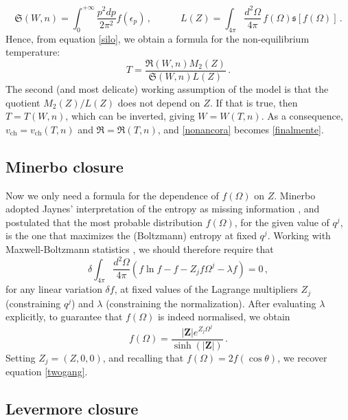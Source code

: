 \documentclass[a4paper, amsfonts, amssymb, amsmath, reprint, showkeys, nofootinbib, twoside, onecolumn, notitlepage]{revtex4-1}
\newcommand{\spc}{\quad \quad \quad}
\begin{document}
\begin{equation}
\mathfrak{S}(W,n)= \int_0^{+\infty} \dfrac{p^2 dp}{2\pi^2} f(\epsilon_p) \, , \spc 
L(Z)=  \int_{4\pi} \dfrac{d^2 \Omega}{4\pi} \, f(\Omega) \mathfrak{s}[f(\Omega)]   \, .
\end{equation}
Hence, from equation \eqref{silo}, we obtain a formula for the non-equilibrium temperature:
\begin{equation}
    T= \dfrac{\mathfrak{R}(W,n)M_2(Z)}{\mathfrak{S}(W,n)L(Z)} \, .
\end{equation}
The second (and most delicate) working assumption of the model is that the quotient $M_2(Z)/L(Z)$ does not depend on $Z$. If that is true, then $T=T(W,n)$, which can be inverted, giving $W=W(T,n)$. As a consequence, $v_{\text{ch}}=v_{\text{ch}}(T,n)$ and $\mathfrak{R}=\mathfrak{R}(T,n)$, and \eqref{nonancora} becomes \eqref{finalmente}.

\subsection{Minerbo closure}

Now we only need a formula for the dependence of $f(\Omega)$ on $Z$. Minerbo \cite{MINERBO1978} adopted Jaynes' interpretation of the entropy as missing information \cite{Jaynes1}, and postulated that the most probable distribution $f(\Omega)$, for the given value of $q^j$, is the one that maximizes the (Boltzmann) entropy at fixed $q^j$. Working with Maxwell-Boltzmann statistics \cite{huang_book,landau5}, we should therefore require that
\begin{equation}
    \delta \! \! \int_{4\pi} \dfrac{d^2 \Omega}{4\pi} (f\ln f-f-Z_j  f\Omega^j-\lambda f) =0 \, ,
\end{equation}
for any linear variation $\delta f$, at fixed values of the Lagrange multipliers $Z_j$ (constraining $q^j$) and $\lambda$ (constraining the normalization). After evaluating $\lambda$ explicitly, to guarantee that $f(\Omega)$ is indeed normalised, we obtain
\begin{equation}
    f(\Omega) = \dfrac{|\textbf{Z}| e^{Z_j \Omega^j} }{\sinh(|\textbf{Z}|)} \, .
\end{equation}
Setting $Z_j=(Z,0,0)$, and recalling that $f(\Omega)=2f(\cos \theta)$, we recover equation \eqref{twogang}.

\subsection{Levermore closure}
\end{document}

